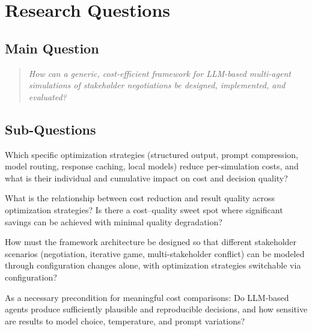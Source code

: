 \documentclass[12pt, a4paper]{article}
\begin{document}
\section{Research Questions}

\subsection*{Main Question}

\begin{quote}
    \textit{How can a generic, cost-efficient framework for LLM-based multi-agent simulations of stakeholder negotiations be designed, implemented, and evaluated?}
\end{quote}

\subsection*{Sub-Questions}

\begin{description}[style=nextline, leftmargin=1.5cm]
    \item[RQ1 (Cost Optimization --- Core)] Which specific optimization strategies (structured output, prompt compression, model routing, response caching, local models) reduce per-simulation costs, and what is their individual and cumulative impact on cost and decision quality?

    \item[RQ2 (Cost--Quality Tradeoff)] What is the relationship between cost reduction and result quality across optimization strategies? Is there a cost--quality sweet spot where significant savings can be achieved with minimal quality degradation?

    \item[RQ3 (Architecture)] How must the framework architecture be designed so that different stakeholder scenarios (negotiation, iterative game, multi-stakeholder conflict) can be modeled through configuration changes alone, with optimization strategies switchable via configuration?

    \item[RQ4 (Validity \& Reproducibility)] As a necessary precondition for meaningful cost comparisons: Do LLM-based agents produce sufficiently plausible and reproducible decisions, and how sensitive are results to model choice, temperature, and prompt variations?
\end{description}
\end{document}
